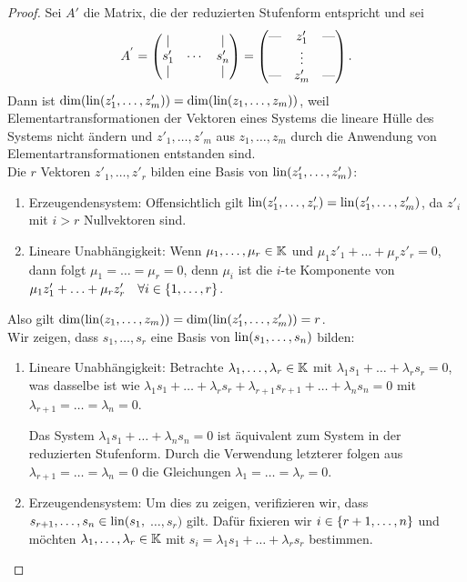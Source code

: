 \begin{proof}
	
	Sei $ A' $ die Matrix, die der reduzierten Stufenform entspricht und sei 
	\begin{equation*}
		A^{'} =
			\begin{pmatrix}
			| & & | \\
			s'_1 & \cdots & s'_n \\
			| & & |
			\end{pmatrix}
		=
			\begin{pmatrix}
			\text{\textemdash} & z'_1 & \text{\textemdash} \\
			& \vdots & \\
			\text{\textemdash} & z'_m & \text{\textemdash}
			\end{pmatrix}.
	\end{equation*}
	Dann ist $ \dim (\operatorname{lin}(z'_1, \ldots, z'_m)) = \dim (\operatorname{lin}(z_1, \ldots, z_m) )$, weil Elementartransformationen der Vektoren eines Systems die lineare Hülle des Systems nicht ändern und $ z'_1, \ldots, z'_m $ aus $ z_1, \ldots, z_m $ durch die Anwendung von Elementartransformationen entstanden sind.\\[10pt]
	Die $ r $ Vektoren $ z'_1, \ldots, z'_r $ bilden eine Basis von $ \operatorname{lin} (z'_1, \ldots, z'_m )$:
	\begin{enumerate}
		\item Erzeugendensystem:
			Offensichtlich gilt $ \operatorname{lin} ( z'_1, \ldots, z'_r ) = \operatorname{lin} ( z'_1, \ldots, z'_m ) $, da $ z'_i $ mit $ i > r $ Nullvektoren sind.

		\item Lineare Unabhängigkeit:
			Wenn $ \mu_1, \ldots, \mu_r \in \mathbb K $ und $ \mu_1 z'_1 + \ldots + \mu_r z'_r = 0 $, dann folgt $ \mu_1 = \ldots = \mu_r = 0 $, denn $ \mu_i $ ist die $ i $-te Komponente von $ \mu_1 z'_1 + \ldots + \mu_r z'_r \quad \forall i \in \{ 1,\ldots,r \} $.
	\end{enumerate}
	Also gilt $ \dim(\operatorname{lin}(z_1, \ldots, z_m)) = \dim(\operatorname{lin}(z'_1, \ldots, z'_m)) = r $.\\[10pt]
	Wir zeigen, dass $ s_1, \ldots, s_r $ eine Basis von $ \operatorname{lin}(s_1, \ldots, s_n) $ bilden:
	\begin{enumerate}
		\item Lineare Unabhängigkeit:
			Betrachte $ \lambda_1, \ldots, \lambda_r \in \mathbb K $ mit $ \lambda_1 s_1 + \ldots + \lambda_r s_r = 0 $, was dasselbe ist wie $ \lambda_1 s_1 + \ldots + \lambda_r s_r + \lambda_{r+1} s_{r+1} + \ldots + \lambda_n s_n = 0 $ mit $ \lambda_{r+1} = \ldots = \lambda_n = 0 $.

			Das System $ \lambda_1 s_1 + \ldots + \lambda_n s_n = 0 $ ist äquivalent zum System in der reduzierten Stufenform. Durch die Verwendung letzterer folgen aus $ \lambda_{r+1} = \ldots = \lambda_n = 0 $ die Gleichungen  $ \lambda_1 = \ldots = \lambda_r = 0 $.
		\item Erzeugendensystem:
			Um dies zu zeigen, verifizieren wir, dass $ s_{r+1}, \ldots, s_n \in \operatorname{lin}(s_1, $ $ \ldots, s_r) $ gilt. Dafür fixieren wir $ i \in \{ r+1,\ldots,n \} $ und möchten $ \lambda_1, \ldots, \lambda_r \in \mathbb K $ mit $ s_i = \lambda_1 s_1 + \ldots + \lambda_r s_r $ bestimmen.


\end{enumerate}
\end{proof}
